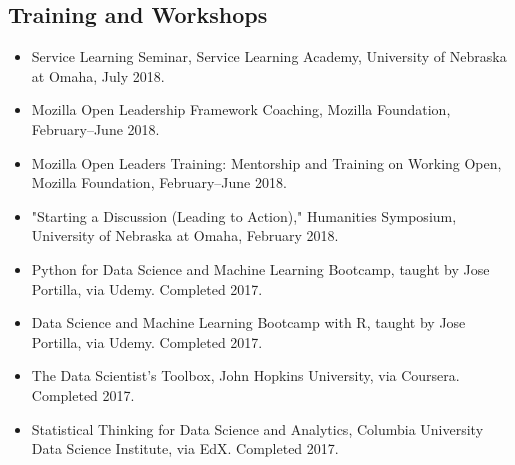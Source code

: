 \documentclass[10pt]{article}
\begin{document}
\subsection*{Training and Workshops}
\begin{itemize}
  \item Service Learning Seminar, Service Learning Academy, University of Nebraska at Omaha, July 2018.
  
  \item Mozilla Open Leadership Framework Coaching, Mozilla Foundation, February--June 2018.
  
  \item Mozilla Open Leaders Training: Mentorship and Training on Working Open, Mozilla Foundation, February--June 2018.
  
  \item "Starting a Discussion (Leading to Action)," Humanities Symposium, University of Nebraska at Omaha, February 2018.
  
  \item Python for Data Science and Machine Learning Bootcamp, taught by Jose Portilla, via Udemy. Completed 2017.
  
  \item Data Science and Machine Learning Bootcamp with R, taught by Jose Portilla, via Udemy. Completed 2017.
  
  \item The Data Scientist's Toolbox, John Hopkins University, via Coursera. Completed 2017.
  
  \item Statistical Thinking for Data Science and Analytics, Columbia University Data Science Institute, via EdX. Completed 2017.
\end{itemize}
\end{document}
